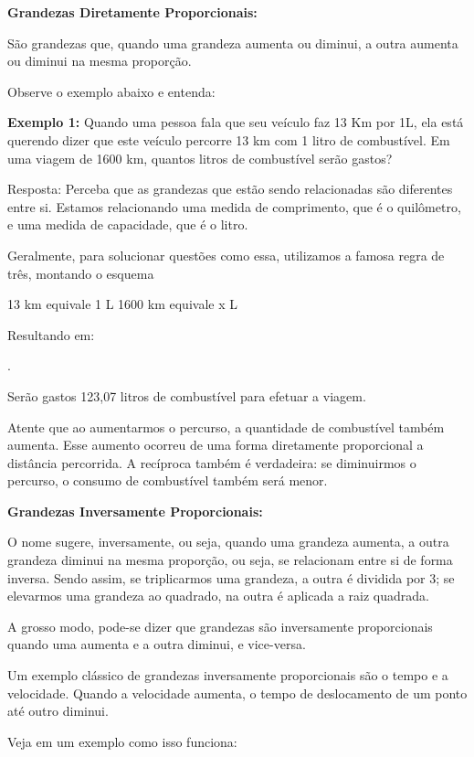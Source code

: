 \begin{multicols*}{2}
	\textbf{Grandezas Diretamente Proporcionais:}
	
	São grandezas que, quando uma grandeza aumenta ou diminui, a outra aumenta ou diminui na mesma proporção.
	
	Observe o exemplo abaixo e entenda:

\textbf{Exemplo 1:} Quando uma pessoa fala que seu veículo faz 13 Km por 1L, ela está querendo dizer que este veículo percorre 13 km com 1 litro de combustível. Em uma viagem de 1600 km, quantos litros de combustível serão gastos?

Resposta: Perceba que as grandezas que estão sendo relacionadas são diferentes entre si. Estamos relacionando uma medida de comprimento, que é o quilômetro, e uma medida de capacidade, que é o litro.

Geralmente, para solucionar questões como essa, utilizamos a famosa regra de três, montando o esquema

13 km   equivale 1 L
1600 km equivale x L

	Resultando em:


.

	Serão gastos 123,07 litros de combustível para efetuar a viagem.

	Atente que ao aumentarmos o percurso, a quantidade de combustível também aumenta. Esse aumento ocorreu de uma forma diretamente proporcional a distância percorrida. A recíproca também é verdadeira: se diminuirmos o percurso, o consumo de combustível também será menor.

	\textbf{Grandezas Inversamente Proporcionais:}
	
	O nome sugere, inversamente, ou seja, quando uma grandeza aumenta, a outra grandeza diminui na mesma proporção, ou seja, se relacionam entre si de forma inversa. Sendo assim, se triplicarmos uma grandeza, a outra é dividida por 3; se elevarmos uma grandeza ao quadrado, na outra é aplicada a raiz quadrada.
	
A grosso modo, pode-se dizer que grandezas são inversamente proporcionais quando uma aumenta e a outra diminui, e vice-versa.

Um exemplo clássico de grandezas inversamente proporcionais são o tempo e a velocidade. Quando a velocidade aumenta, o tempo de deslocamento de um ponto até outro diminui.

Veja em um exemplo como isso funciona:


\end{multicols*}
